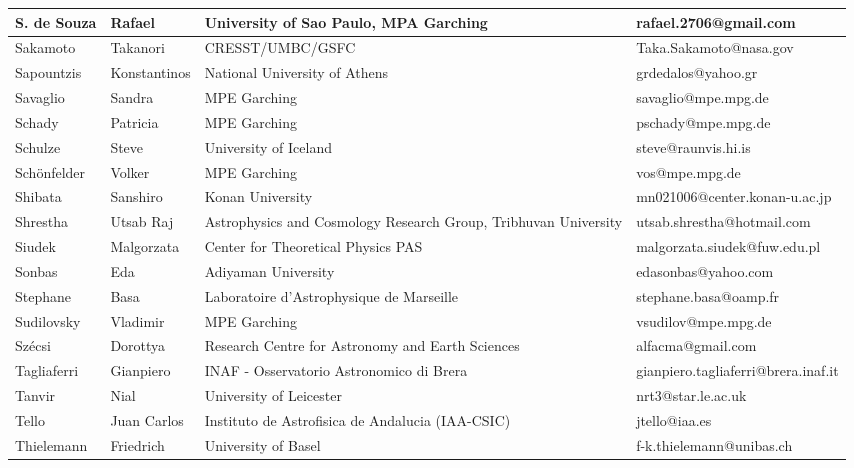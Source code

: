 \begin{center}
\begin{longtable}{|p{1.28cm} |p{1.28cm} |p{2.9cm} |p{3cm} |}
\tiny S. de Souza &\tiny Rafael & \tiny University of Sao Paulo, MPA Garching & \tiny rafael.2706@gmail.com \\ \hline
\tiny Sakamoto &\tiny Takanori & \tiny CRESST/UMBC/GSFC & \tiny Taka.Sakamoto@nasa.gov \\ \hline
\tiny Sapountzis &\tiny Konstantinos & \tiny National University of Athens & \tiny grdedalos@yahoo.gr \\ \hline
\tiny Savaglio &\tiny Sandra & \tiny MPE Garching & \tiny savaglio@mpe.mpg.de \\ \hline
\tiny Schady &\tiny Patricia & \tiny MPE Garching & \tiny pschady@mpe.mpg.de \\ \hline
\tiny Schulze &\tiny Steve & \tiny University of Iceland & \tiny steve@raunvis.hi.is \\ \hline
\tiny Sch\"onfelder &\tiny Volker & \tiny MPE Garching & \tiny vos@mpe.mpg.de \\ \hline
\tiny Shibata &\tiny Sanshiro & \tiny Konan University & \tiny mn021006@center.konan-u.ac.jp \\ \hline
\tiny Shrestha &\tiny Utsab Raj & \tiny Astrophysics and Cosmology Research Group, Tribhuvan University & \tiny utsab.shrestha@hotmail.com \\ \hline
\tiny Siudek &\tiny Malgorzata & \tiny Center for Theoretical Physics PAS & \tiny malgorzata.siudek@fuw.edu.pl \\ \hline
\tiny Sonbas &\tiny Eda & \tiny Adiyaman University & \tiny edasonbas@yahoo.com \\ \hline
\tiny Stephane &\tiny Basa & \tiny Laboratoire d'Astrophysique de Marseille & \tiny stephane.basa@oamp.fr \\ \hline
\tiny Sudilovsky &\tiny Vladimir & \tiny MPE Garching & \tiny vsudilov@mpe.mpg.de \\ \hline
\tiny Sz\'ecsi &\tiny Dorottya & \tiny Research Centre for Astronomy and Earth Sciences & \tiny alfacma@gmail.com \\ \hline
\tiny Tagliaferri &\tiny Gianpiero & \tiny INAF - Osservatorio Astronomico di Brera & \tiny gianpiero.tagliaferri@brera.inaf.it \\ \hline
\tiny Tanvir &\tiny Nial & \tiny University of Leicester & \tiny nrt3@star.le.ac.uk \\ \hline
\tiny Tello &\tiny Juan Carlos & \tiny Instituto de Astrofisica de Andalucia (IAA-CSIC) & \tiny jtello@iaa.es \\ \hline
\tiny Thielemann &\tiny Friedrich & \tiny University of Basel & \tiny f-k.thielemann@unibas.ch \\ \hline

\end{longtable}
\end{center}

